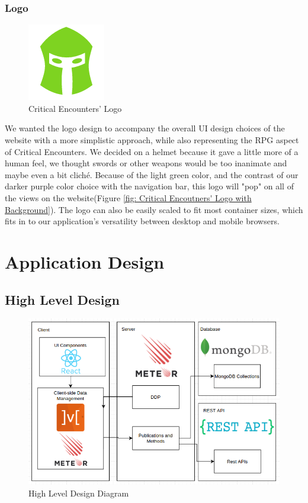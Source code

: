 \documentclass[12pt,a4paper]{report}
\begin{document}
	\subsection {Logo}
	\begin{figure}[H]
		\centering
		\includegraphics[scale=.5]{logo-large}
		\caption{Critical Encounters' Logo}
		\label{fig: Critical Encounters' Logo}
	\end{figure}
	We wanted the logo design to accompany the overall UI design choices of the website with a more simplistic approach, while also representing the RPG aspect of Critical Encounters. We decided on a helmet because it gave a little more of a human feel, we thought swords or other weapons would be too inanimate and maybe even a bit cliché. Because of the light green color, and the contrast of our darker purple color choice with the navigation bar, this logo will "pop" on all of the views on the website(Figure \ref{fig: Critical Encoutners' Logo with Background}). The logo can also be easily scaled to fit most container sizes, which fits in to our application's versatility between desktop and mobile browsers.


	
	\newpage
	\chapter*{Application Design}
	\section {High Level Design}
	\begin{figure}[H]
		\centering
		\includegraphics[scale=.5]{designsd.png}
		\caption{High Level Design Diagram}
		\label{fig: High Level Design}
	\end{figure}
	
\end{document}
